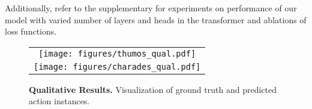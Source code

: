 \documentclass[10pt,twocolumn,letterpaper]{article}
\begin{document}
Additionally, refer to the supplementary for experiments on performance of our model with varied number of layers and heads in the transformer and ablations of loss functions.










\begin{figure}[!t]
    \centering
    \begin{tabular}{c}
        \texttt{[image: figures/thumos\_qual.pdf]}\\
        \texttt{[image: figures/charades\_qual.pdf]}
    \end{tabular}


\vspace{-1mm}
    \caption{\textbf{Qualitative Results. }Visualization of ground truth and predicted action instances.}
    \vspace{-5mm}
    \label{fig:qual}
\end{figure}
\end{document}
